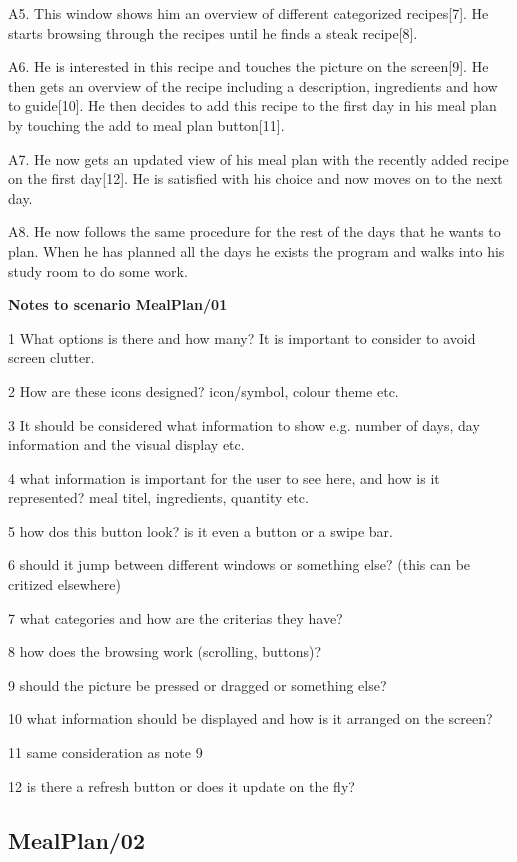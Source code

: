 	A5. This window shows him an overview of different categorized recipes[7]. He starts browsing through the recipes until he finds a steak recipe[8]. 
	
	A6. He is interested in this recipe and touches the picture on the screen[9]. He then gets an overview of the recipe including a description, ingredients and how to guide[10]. He then decides to add this recipe to the first day in his meal plan by touching the add to meal plan button[11].
	
	A7. He now gets an updated view of his meal plan with the recently added recipe on the first day[12]. He is satisfied with his choice and now moves on to the next day. 
	
	A8. He now follows the same procedure for the rest of the days that he wants to plan. When he has planned all the days he exists the program and walks into his study room to do some work.
	
\textbf{Notes to scenario MealPlan/01}

1 What options is there and how many? It is important to consider to avoid screen clutter.

2 How are these icons designed? icon/symbol, colour theme etc.

3 It should be considered what information to show e.g. number of days, day information and the visual display etc.

4 what information is important for the user to see here, and how is it represented? meal titel, ingredients, quantity etc.

5 how dos this button look? is it even a button or a swipe bar.

6 should it jump between different windows or something else? (this can be critized elsewhere)

7 what categories and how are the criterias they have?

8 how does the browsing work (scrolling, buttons)?

9 should the picture be pressed or dragged or something else?

10 what information should be displayed and how is it arranged on the screen?

11 same consideration as note 9

12 is there a refresh button or does it update on the fly?

\subsection{MealPlan/02} \label{MealPlan02}

